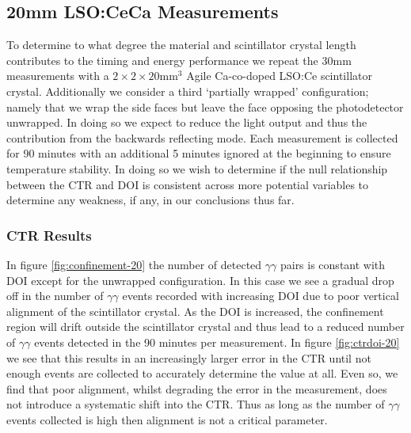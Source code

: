 \subsection{20mm LSO:CeCa Measurements}
\label{sec:20mm}

To determine to what degree the material and scintillator crystal length contributes to the timing and energy performance we repeat the 30mm measurements with a $2\times2\times20$mm$^3$ Agile Ca-co-doped LSO:Ce scintillator crystal. Additionally we consider a third `partially wrapped' configuration; namely that we wrap the side faces but leave the face opposing the photodetector unwrapped. In doing so we expect to reduce the light output and thus the contribution from the backwards reflecting mode. Each measurement is collected for 90 minutes with an additional 5 minutes ignored at the beginning to ensure temperature stability. In doing so we wish to determine if the null relationship between the CTR and DOI is consistent across more potential variables  to determine any weakness, if any, in our conclusions thus far.

\subsubsection{CTR Results}
In figure \ref{fig:confinement-20} the number of detected $\gamma\gamma$ pairs is constant with DOI except for the unwrapped configuration. In this case we see a gradual drop off in the number of $\gamma\gamma$ events recorded with increasing DOI due to poor vertical alignment of the scintillator crystal. As the DOI is increased, the confinement region will drift outside the scintillator crystal and thus lead to a reduced number of $\gamma\gamma$ events detected in the 90 minutes per measurement. In figure \ref{fig:ctrdoi-20} we see that this results in an increasingly larger error in the CTR until not enough events are collected to accurately determine the value at all. Even so, we find that poor alignment, whilst degrading the error in the measurement, does not introduce a systematic shift into the CTR. Thus as long as the number of $\gamma\gamma$ events collected is high then alignment is not a critical parameter. 

